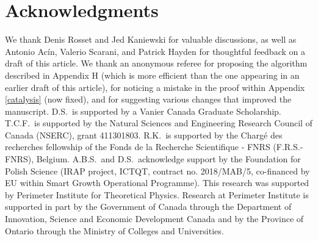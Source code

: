\documentclass[12pt]{article}
\theoremstyle{plain}
\theoremstyle{definition}
\begin{document}
\section*{Acknowledgments}
We thank Denis Rosset and Jed Kaniewski for valuable discussions, as well as Antonio Ac\'in, Valerio Scarani, and Patrick Hayden for thoughtful feedback on a draft of this article.  
 We thank an anonymous referee for proposing the algorithm described in Appendix H (which is more efficient than the one appearing in an earlier draft of this article), for noticing a mistake in the proof within Appendix \ref{catalysis} (now fixed), and for suggesting various changes that improved the manuscript.
D.S.~is supported by a Vanier Canada Graduate Scholarship. T.C.F.~is supported by the Natural Sciences and Engineering Research Council of Canada (NSERC), grant  411301803.
 R.K.~is supported by the Charg\'e des recherches fellowship of the Fonds de la Recherche Scientifique - FNRS (F.R.S.-FNRS), Belgium. A.B.S.~and D.S.~acknowledge  support by the Foundation for Polish Science (IRAP project, ICTQT, contract no. 2018/MAB/5, co-financed by EU within Smart Growth Operational Programme). This research was supported by Perimeter Institute for Theoretical Physics. Research at Perimeter Institute is supported in part by the Government of Canada through the Department of Innovation, Science and Economic Development Canada and by the Province of Ontario through the Ministry of Colleges and Universities.

%


\end{document}
